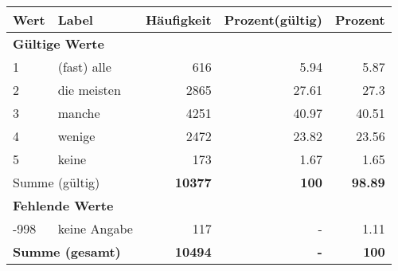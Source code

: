      \begin{longtable}{lXrrr}
     \toprule
     \textbf{Wert} & \textbf{Label} & \textbf{Häufigkeit} & \textbf{Prozent(gültig)} & \textbf{Prozent} \\
     \endhead
     \midrule
     \multicolumn{5}{l}{\textbf{Gültige Werte}}\\

     1 &
     \multicolumn{1}{X}{ (fast) alle   } &


       \num{616} &
       \num[round-mode=places,round-precision=2]{5.94} &
         \num[round-mode=places,round-precision=2]{5.87} \\

     2 &
     \multicolumn{1}{X}{ die meisten   } &


       \num{2865} &
       \num[round-mode=places,round-precision=2]{27.61} &
         \num[round-mode=places,round-precision=2]{27.3} \\

     3 &
     \multicolumn{1}{X}{ manche   } &


       \num{4251} &
       \num[round-mode=places,round-precision=2]{40.97} &
         \num[round-mode=places,round-precision=2]{40.51} \\

     4 &
     \multicolumn{1}{X}{ wenige   } &


       \num{2472} &
       \num[round-mode=places,round-precision=2]{23.82} &
         \num[round-mode=places,round-precision=2]{23.56} \\

     5 &
     \multicolumn{1}{X}{ keine   } &


       \num{173} &
       \num[round-mode=places,round-precision=2]{1.67} &
         \num[round-mode=places,round-precision=2]{1.65} \\
     \midrule
     \multicolumn{2}{l}{Summe (gültig)} &
       \textbf{\num{10377}} &
     \textbf{\num{100}} &
       \textbf{\num[round-mode=places,round-precision=2]{98.89}} \\
     \multicolumn{5}{l}{\textbf{Fehlende Werte}}\\
       -998 &
       keine Angabe &
         \num{117} &
        - &
         \num[round-mode=places,round-precision=2]{1.11} \\
     \midrule
     \multicolumn{2}{l}{\textbf{Summe (gesamt)}} &
          \textbf{\num{10494}} &
        \textbf{-} &
        \textbf{\num{100}} \\
     \bottomrule
     \end{longtable}
     
